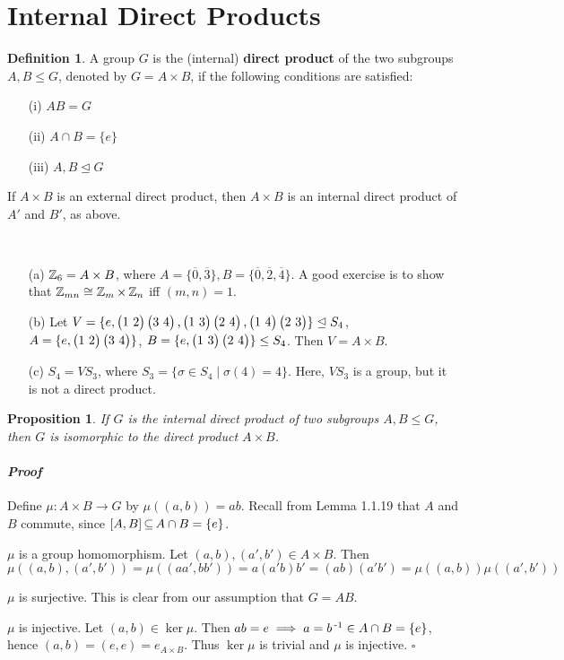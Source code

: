 \documentclass[11pt]{book}
\newcounter{counter}
\newtheorem{proposition}[counter]{Proposition}   \newtheorem{problem}[counter]{Problem}   \newtheorem*{proposition*}{Proposition}   \newtheorem*{lemma*}{Lemma}
\theoremstyle{definition}   \newtheorem{defn}[counter]{Definition} %
\newcommand{\ov}{\overline}   \newcommand{\wt}{\widetilde}
\newcommand{\nsg}{\mathrel{\unlhd}}   \newcommand{\ind}{\parindent24pt}   \newcommand{\vn}{\varnothing}
\newcommand{\hm}{homomorphism}   \newcommand{\hms}{homomorphisms}   \newcommand{\iso}{isomorphism}
\DeclareMathOperator{\ra}{\rightarrow}   \DeclareMathOperator{\Poly}{\mathbf{P}}   \DeclareMathOperator{\spn}{\textnormal{span}}   \DeclareMathOperator{\aut}{\textnormal{Aut}}
\newenvironment{prf}{\paragraph{\textit{Proof}}}{\hfill$\square$}
\newcommand{\vs}{\vspace{8pt}}
\numberwithin{counter}{chapter}
\begin{document}
\section*{Internal Direct Products}

\vs

\begin{defn}
A group $G$ is the (internal) \textbf{direct product} of the two subgroups $A,B \leq G$, denoted by $G = A \times B$, if the following conditions are satisfied:
	\begin{enumerate}
	\item[(i)] $AB = G$
	\item[(ii)] $A\cap B = \{e\}$
	\item[(iii)] $A,B \nsg G$
	\end{enumerate}

\vs

\begin{remark*}
If $A\times B$ is an external direct product, then $A \times B$ is an internal direct product of $A'$ and $B'$, as above.
\end{remark*}

\vs

\begin{example}\
\begin{enumerate}
\item[(a)] $\operatorname{\mathbb{Z}}_6 = A \times B$, where $A = \{\ov{0},\ov{3}\}, B = \{\ov{0},\ov{2},\ov{4}\}$. A good exercise is to show that $\operatorname{\mathbb{Z}}_{mn} \cong \operatorname{\mathbb{Z}}_m\times \operatorname{\mathbb{Z}}_n$ iff $(m,n) = 1$.
\item[(b)] Let $V = \{e,\cyc{1\ 2}\cyc{3\ 4},\cyc{1\ 3}\cyc{2\ 4},\cyc{1\ 4}\cyc{2\ 3}\} \nsg S_4$, $A = \{e,\begin{pmatrix} 1\ 2 \end{pmatrix}\begin{pmatrix} 3\ 4 \end{pmatrix}\}$, $B = \{e, \begin{pmatrix} 1\ 3 \end{pmatrix}\begin{pmatrix} 2\ 4 \end{pmatrix}\} \leq S_4$. Then $V = A \times B$.
\item[(c)] $S_4 = VS_3$, where $S_3 = \{\sigma \in S_4 \mid \sigma(4)=4\}$. Here, $VS_3$ is a group, but it is not a direct product.
\end{enumerate}
\end{example}
\end{defn}

\vs

\begin{proposition}
If $G$ is the internal direct product of two subgroups $A,B \leq G$, then $G$ is isomorphic to the direct product $A \times B$.
\end{proposition}

\begin{prf}
Define $\mu : A \times B \ra G$ by $\mu((a,b)) = ab$. Recall from Lemma 1.1.19 that $A$ and $B$ commute, since $[A,B] \operatorname{\subseteq} A\cap B = \{e\}$.

$\mu$ is a group \hm. Let $(a,b),(a',b') \in A \times B$. Then
	\[\mu((a,b),(a',b')) = \mu((aa',bb')) = a(a'b)b' = (ab)(a'b') = \mu((a,b))\mu((a',b')) \]

$\mu$ is surjective. This is clear from our assumption that $G = AB$.

$\mu$ is injective. Let $(a,b) \in \ker \mu$. Then $ab = e \implies a = b\operatorname{^{-1}} \in A\cap B = \{e\}$, hence $(a,b) = (e,e) = e_{A\times B}$. Thus $\ker \mu$ is trivial and $\mu$ is injective.
\end{prf}
\end{document}
